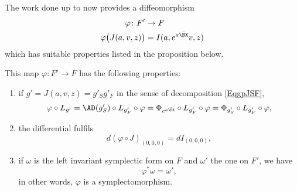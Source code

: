 The work done up to now provides a diffeomorphism
\begin{equation}
	\begin{aligned}
		\varphi\colon F'            & \to F                     \\
		\varphi\big( J(a,v,z) \big) & =I(a, e^{a\bar{\BX }}v,z)
	\end{aligned}
\end{equation}
which has suitable properties listed in the proposition below.

\begin{proposition}
	This map $\varphi\colon F'\to F$ has the following properties:
	\begin{enumerate}
		\item if $g'=J(a,v,z)=g'_{S}g'_{F}$ in the sense of decomposition \eqref{EqgpJSF},
		      \begin{equation}
			      \varphi\circ L_{g'}=\AD(g'_{S})\circ L_{g'_{F}}\circ\varphi=\Phi_{ e^{a\bar{\BX }}}\circ L_{g'_{F}}\circ\varphi=\Phi_{g'_{S}}\circ L_{g'_{F}}\circ\varphi,
		      \end{equation}
		\item the differential fulfils
		      \begin{equation}
			      d(\varphi\circ J)_{(0,0,0)}=dI_{(0,0,0)},
		      \end{equation}
		\item if $\omega$ is the left invariant symplectic form on $F$ and $\omega'$ the one on $F'$, we have
		      \[
			      \varphi^*\omega=\omega',
		      \]
		      in other words, $\varphi$ is a symplectomorphism.

	\end{enumerate}

\end{proposition}
